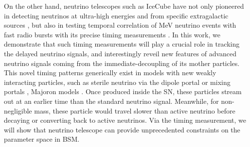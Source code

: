 On the other hand, neutrino telescopes such as IceCube have not only pioneered in detecting neutrinos at ultra-high energies \cite{IceCube:2014stg,IceCube:2018cha} and from specific extragalactic sources \cite{IceCube:2023ame,IceCube:2022der}, but also in testing temporal correlation of MeV neutrino events with fast radio bursts with its precise timing measurements \cite{IceCube:2019acm}. In this work, we demonstrate that such timing measurements will play a crucial role in tracking the delayed neutrino signals, and interestingly reveil new features of advanced neutrino signals coming from the immediate-decoupling of its mother particles. This novel timing patterns generically exist in models with new weakly interacting particles, such as sterile neutrino via the dipole portal \cite{Magill:2018jla,Brdar:2020quo,Brdar:2023tmi} or mixing portals \cite{Arg_elles_2019, Suliga_2020}, Majoron models \cite{Fiorillo:2022cdq}. Once produced inside the SN, these particles stream out at an earlier time than the standard neutrino signal. Meanwhile, for non-negligible mass, these particle would travel slower than active neutrino before decaying or converting back to active neutrinos. Via the timing measurement, we will show that neutrino telescope can provide unprecedented constraints on the parameter space in BSM.\\ 